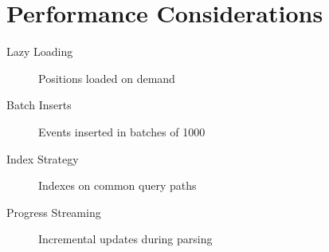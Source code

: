 \section{Performance Considerations}


\begin{description}
    \item[Lazy Loading] Positions loaded on demand
    \item[Batch Inserts] Events inserted in batches of 1000
    \item[Index Strategy] Indexes on common query paths
    \item[Progress Streaming] Incremental updates during parsing
\end{description}
